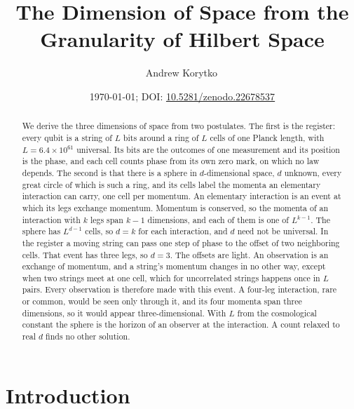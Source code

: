 \documentclass[aps,prd,twocolumn,superscriptaddress,nofootinbib]{revtex4-2}
\begin{document}
\title{The Dimension of Space from the Granularity of Hilbert Space}

\author{Andrew Korytko\,}

\date{\today; DOI: \href{https://doi.org/10.5281/zenodo.22678537}{10.5281/zenodo.22678537}}

\begin{abstract}
We derive the three dimensions of space from two postulates. The first is the register: every qubit is a string of $L$ bits around a ring of $L$ cells of one Planck length, with $L = 6.4\times10^{61}$ universal. Its bits are the outcomes of one measurement and its position is the phase, and each cell counts phase from its own zero mark, on which no law depends. The second is that there is a sphere in $d$-dimensional space, $d$ unknown, every great circle of which is such a ring, and its cells label the momenta an elementary interaction can carry, one cell per momentum. An elementary interaction is an event at which its legs exchange momentum. Momentum is conserved, so the momenta of an interaction with $k$ legs span $k-1$ dimensions, and each of them is one of $L^{k-1}$. The sphere has $L^{d-1}$ cells, so $d = k$ for each interaction, and $d$ need not be universal. In the register a moving string can pass one step of phase to the offset of two neighboring cells. That event has three legs, so $d = 3$. The offsets are light. An observation is an exchange of momentum, and a string's momentum changes in no other way, except when two strings meet at one cell, which for uncorrelated strings happens once in $L$ pairs. Every observation is therefore made with this event. A four-leg interaction, rare or common, would be seen only through it, and its four momenta span three dimensions, so it would appear three-dimensional. With $L$ from the cosmological constant the sphere is the horizon of an observer at the interaction. A count relaxed to real $d$ finds no other solution.
\end{abstract}


\maketitle

\section{Introduction}
\label{sec:intro}
\end{document}
